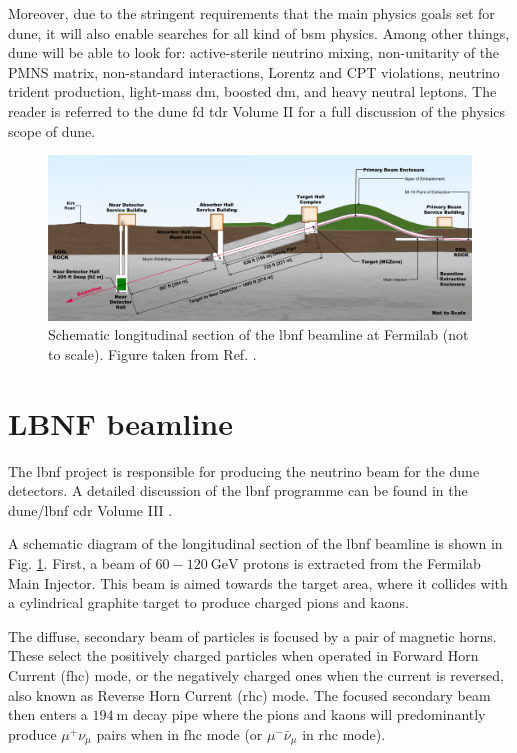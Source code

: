 Moreover, due to the stringent requirements that the main physics goals set for \gls{dune}, it will also enable searches for all kind of \gls{bsm} physics. Among other things, \gls{dune} will be able to look for: active-sterile neutrino mixing, non-unitarity of the PMNS matrix, non-standard interactions, Lorentz and CPT violations, neutrino trident production, light-mass \gls{dm}, boosted \gls{dm}, and heavy neutral leptons. The reader is referred to the \gls{dune} \gls{fd} \gls{tdr} Volume II \cite{DUNE2020TDR2} for a full discussion of the physics scope of \gls{dune}.

\begin{figure}[t]
	\centering
	\includegraphics[width=0.95\linewidth]{Images/DUNE/LBNF/beamline-sideview}
	\caption[Schematic longitudinal section of the \gls{lbnf} beamline at Fermilab.]{Schematic longitudinal section of the \gls{lbnf} beamline at Fermilab (not to scale). Figure taken from Ref. \cite{DUNE2016CDR3}.}
	\label{fig:lbnf_beamline}
\end{figure}

\section{LBNF beamline}

The \gls{lbnf} project is responsible for producing the neutrino beam for the \gls{dune} detectors. A detailed discussion of the \gls{lbnf} programme can be found in the \gls{dune}/\gls{lbnf} \gls{cdr} Volume III \cite{DUNE2016CDR3}.

A schematic diagram of the longitudinal section of the \gls{lbnf} beamline is shown in Fig. \ref{fig:lbnf_beamline}. First, a beam of $60-120~\mathrm{GeV}$ protons is extracted from the Fermilab Main Injector. This beam is aimed towards the target area, where it collides with a cylindrical graphite target to produce charged pions and kaons.

The diffuse, secondary beam of particles is focused by a pair of magnetic horns. These select the positively charged particles when operated in Forward Horn Current (\gls{fhc}) mode, or the negatively charged ones when the current is reversed, also known as Reverse Horn Current (\gls{rhc}) mode. The focused secondary beam then enters a $194~\mathrm{m}$ decay pipe where the pions and kaons will predominantly produce $\mu^{+}\nu_{\mu}$ pairs when in \gls{fhc} mode (or $\mu^{-}\bar{\nu}_{\mu}$ in \gls{rhc} mode).

